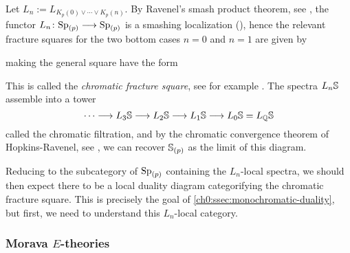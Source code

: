 Let $L_n := L_{K_p(0)\vee \cdots \vee K_p(n)}$. By Ravenel's smash product theorem, see \cite[7.5.6]{ravenel_92}, the functor $L_n\colon \sp_{(p)}\longrightarrow \sp_{(p)}$ is a smashing localization (\crefme), hence the relevant fracture squares for the two bottom cases $n=0$ and $n=1$ are given by
\begin{center}
\end{center}
making the general square have the form
\begin{center}
\end{center}
This is called the \emph{chromatic fracture square}, see for example \cite[4.3]{hovey_95}. The spectra $L_n\S$ assemble into a tower 
$$\cdots \longrightarrow L_3\S \longrightarrow L_2\S \longrightarrow L_1\S \longrightarrow L_0 \S = L_\Q\S$$
called the chromatic filtration, and by the chromatic convergence theorem of Hopkins-Ravenel, see \cite[7.5.7]{ravenel_92}, we can recover $\S_{(p)}$ as the limit of this diagram. 


\begin{remark}
    \label{ch0:rm:chromatic-square-from-duality}
    Reducing to the subcategory of $\sp_{(p)}$ containing the $L_n$-local spectra, we should then expect there to be a local duality diagram categorifying the chromatic fracture square. This is precisely the goal of \cref{ch0:ssec:monochromatic-duality}, but first, we need to understand this $L_n$-local category. 
\end{remark}







\subsubsection{Morava \texorpdfstring{$E$}{E}-theories}
\label{ch0:sssec:morava-E-theories}

